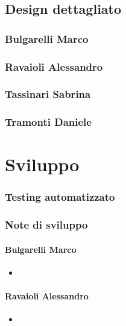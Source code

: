 \documentclass{report}
\begin{document}
\section{Design dettagliato}

\subsection{Bulgarelli Marco}

\subsection{Ravaioli Alessandro}

\subsection{Tassinari Sabrina}

\subsection{Tramonti Daniele}

\chapter{Sviluppo}

\subsection{Testing automatizzato}

\subsection{Note di sviluppo}

\subsubsection{Bulgarelli Marco}
\begin{itemize}
    \item 
\end{itemize}

\subsubsection{Ravaioli Alessandro}
\begin{itemize}
    \item 
\end{itemize}
\end{document}
